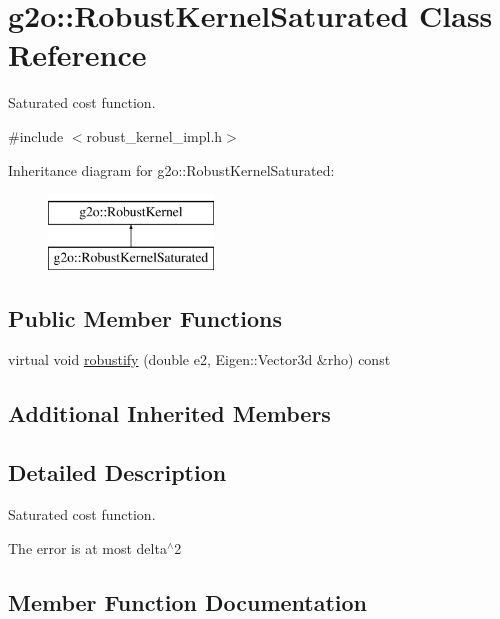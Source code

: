 \hypertarget{classg2o_1_1_robust_kernel_saturated}{}\section{g2o\+:\+:Robust\+Kernel\+Saturated Class Reference}
\label{classg2o_1_1_robust_kernel_saturated}


Saturated cost function.  




{\ttfamily \#include $<$robust\+\_\+kernel\+\_\+impl.\+h$>$}

Inheritance diagram for g2o\+:\+:Robust\+Kernel\+Saturated\+:\begin{figure}[H]
\begin{center}
\leavevmode
\includegraphics[height=2.000000cm]{classg2o_1_1_robust_kernel_saturated}
\end{center}
\end{figure}
\subsection*{Public Member Functions}
\begin{DoxyCompactItemize}
\item 
virtual void \mbox{\hyperlink{classg2o_1_1_robust_kernel_saturated_a2f937dd7f393f52b0c947d8a29f0d8aa}{robustify}} (double e2, Eigen\+::\+Vector3d \&rho) const
\end{DoxyCompactItemize}
\subsection*{Additional Inherited Members}


\subsection{Detailed Description}
Saturated cost function. 

The error is at most delta$^\wedge$2 

\subsection{Member Function Documentation}
\mbox{\label{classg2o_1_1_robust_kernel_saturated_a2f937dd7f393f52b0c947d8a29f0d8aa}} 
